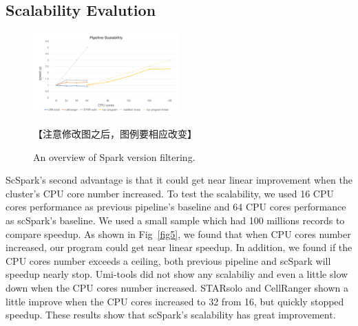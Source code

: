 \documentclass[conference]{IEEEtran}
\begin{document}
\subsection{Scalability Evalution}
\begin{figure}
  \includegraphics[width=0.5\textwidth]{fig4.pdf}
  \caption{An overview of Spark version filtering.} \label{fig4} 【注意修改图之后，图例要相应改变】
\end{figure}
ScSpark's second advantage is that it could get near linear improvement when the cluster's CPU core number increased. 
To test the scalability, we used 16 CPU cores performance as previous pipeline's baseline and 64 CPU cores performance as scSpark's baseline. 
We used a small sample which had 100 millions records to compare speedup. 
As shown in Fig~\ref{fig5}, we found that when CPU cores number increased, our program could get near linear speedup. 
In addition, we found if the CPU cores number exceeds a ceiling, both previous pipeline and scSpark will speedup nearly stop. 
Umi-tools did not show any scalabiliy and even a little slow down when the CPU cores number increased. 
STARsolo and CellRanger shown a little improve when the CPU cores increased to 32 from 16, but quickly stopped speedup. 
These results show that scSpark's scalability has great improvement. 
\end{document}
